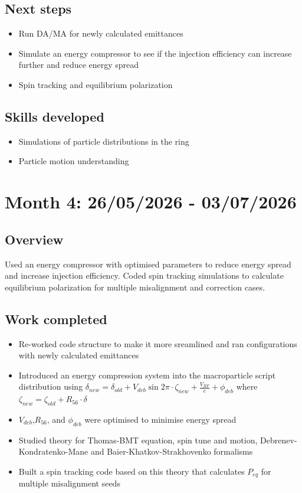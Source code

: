 \documentclass{article}
\begin{document}
\subsection{Next steps}
\begin{itemize}
    \item Run DA/MA for newly calculated emittances 
    \item Simulate an energy compressor to see if the injection efficiency can increase further and reduce energy spread
    \item Spin tracking and equilibrium polarization
\end{itemize}

\subsection{Skills developed}
\begin{itemize}
    \item Simulations of particle distributions in the ring 
    \item Particle motion understanding
\end{itemize}


\section{Month 4: 26/05/2026 - 03/07/2026}
\subsection{Overview}
Used an energy compressor with optimised parameters to reduce energy spread and increase injection efficiency. Coded spin tracking simulations to calculate equilibrium polarization for multiple misalignment and correction cases.

\subsection{Work completed}

\begin{itemize}
\item Re-worked code structure to make it more sreamlined and ran configurations with newly calculated emittances
\item Introduced an energy compression system into the macroparticle script distribution using $\delta_{new}=\delta_{old}+V_{deb}\sin{2\pi\cdot\zeta_{new}+\frac{V_{RF}}{c}+\phi_{deb}}$ where $\zeta_{new}=\zeta_{old}+R_{56}\cdot\delta$
\item $V_{deb}$,$R_{56}$, and $\phi_{deb}$ were optimised to minimise energy spread
\item Studied theory for Thomas-BMT equation, spin tune and motion, Debrenev-Kondratenko-Mane and Baier-Khatkov-Strakhovenko formalisms
\item Built a spin tracking code based on this theory that calculates $P_{eq}$ for multiple misalignment seeds
\end{itemize}
\end{document}
